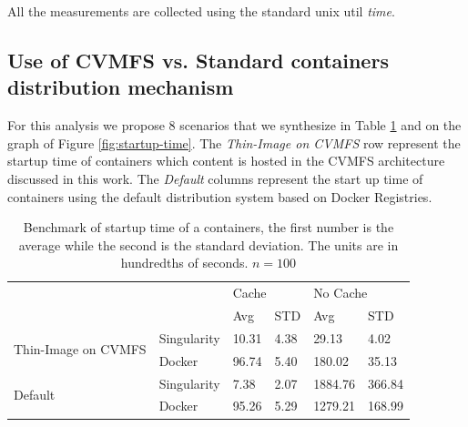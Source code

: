 All the measurements are collected using the standard unix util \textit{time}.

\subsection{Use of CVMFS vs. Standard containers distribution mechanism}

For this analysis we propose 8 scenarios that we synthesize in Table
\ref{tab:benchmark} and on the graph of Figure \ref{fig:startup-time}. The
\textit{Thin-Image on CVMFS} row represent the startup time of containers which
content is hosted in the CVMFS architecture discussed in this work. The
\textit{Default} columns represent the start up time of containers using the
default distribution system based on Docker Registries.

\begin{table}[]
\begin{tabular}{|l|l|l|l|l|l|}
\hline
\multicolumn{2}{|l|}{\multirow{2}{*}{}}            & \multicolumn{2}{l|}{Cache} & \multicolumn{2}{l|}{No Cache} \\ \cline{3-6} 
\multicolumn{2}{|l|}{}                             & Avg          & STD         & Avg            & STD          \\ \hline \hline
\multirow{2}{*}{Thin-Image on CVMFS} & Singularity & 10.31        & 4.38        & 29.13          & 4.02         \\ \cline{2-6} 
                                     & Docker      & 96.74        & 5.40        & 180.02         & 35.13        \\ \hline \hline
\multirow{2}{*}{Default}               & Singularity & 7.38         & 2.07        & 1884.76        & 366.84       \\ \cline{2-6} 
                                     & Docker      & 95.26        & 5.29        & 1279.21        & 168.99       \\ \hline
\end{tabular}
\caption{Benchmark of startup time of a containers, the first number is the average while the second is the standard deviation. The units are in hundredths of seconds. $n = 100$}
\label{tab:benchmark}
\end{table}

